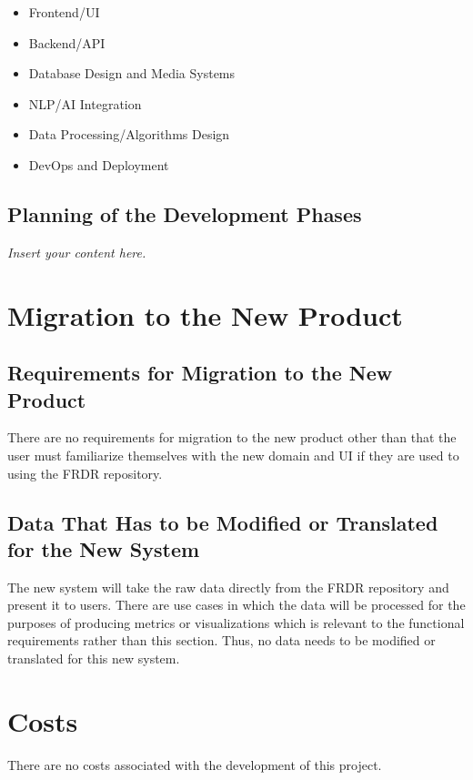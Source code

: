 \documentclass[12pt]{article}
\newcommand{\lips}{\textit{Insert your content here.}}
\begin{document}
\begin{itemize}
    \item Frontend/UI
    \item Backend/API
    \item Database Design and Media Systems
    \item NLP/AI Integration
    \item Data Processing/Algorithms Design
    \item DevOps and Deployment
\end{itemize}

\subsection{Planning of the Development Phases}
\lips

\section{Migration to the New Product}
\subsection{Requirements for Migration to the New Product}

\par{There are no requirements for migration to the new product other than that the user must familiarize themselves with the new domain and UI if they are used to using the FRDR repository.}


\subsection{Data That Has to be Modified or Translated for the New System}

\par{The new system will take the raw data directly from the FRDR repository and present it to users. There are use cases in which the data will be processed for the purposes 
     of producing metrics or visualizations which is relevant to the functional requirements rather than this section. Thus, no data needs to be modified or translated for this new system.}

\section{Costs}

\par{There are no costs associated with the development of this project.}
\end{document}
